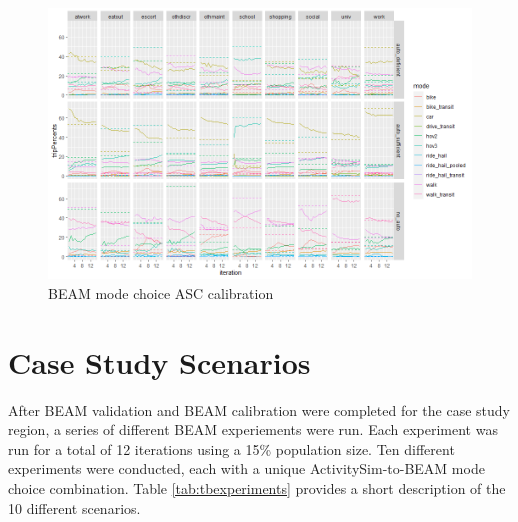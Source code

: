 \documentclass[12pt, oneside, openright]{byuthesis}
\begin{document}
\begin{figure}

{\centering \includegraphics[width=1\linewidth]{pics/BeamCalib} 

}

\caption{BEAM mode choice ASC calibration}\label{fig:fig-beam-calib}
\end{figure}

\hypertarget{meth-scenarios}{%
\section{Case Study Scenarios}\label{meth-scenarios}}

After BEAM validation and BEAM calibration were completed for the case study region, a series of different BEAM experiements were run. Each experiment was run for a total of 12 iterations using a 15\% population size. Ten different experiments were conducted, each with a unique ActivitySim-to-BEAM mode choice combination. Table \ref{tab:tbexperiments} provides a short description of the 10 different scenarios.
\end{document}
